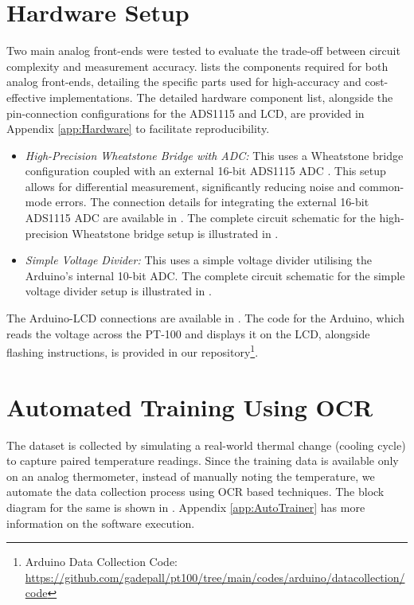 \documentclass[conference]{IEEEtran}
\begin{document}
\section{Hardware Setup}
Two main analog front-ends were tested to evaluate the trade-off between circuit complexity and measurement accuracy.  lists the components required for both analog front-ends, detailing the specific parts used for high-accuracy and cost-effective implementations. The detailed hardware component list, alongside the pin-connection configurations for the ADS1115 and LCD, are provided in Appendix \ref{app:Hardware} to facilitate reproducibility.
%
%
\begin{itemize}
    \item {\em High-Precision Wheatstone Bridge with ADC:} This uses a Wheatstone bridge configuration coupled with an external 16-bit ADS1115 ADC \cite{ads1115_datasheet}. This setup allows for differential measurement, significantly reducing noise and common-mode errors. 
	The connection details for integrating the external 16-bit ADS1115 ADC are  available in . 
	The complete circuit schematic for the high-precision Wheatstone bridge setup is illustrated in .

    \item {\em Simple Voltage Divider:} This uses a simple voltage divider utilising the Arduino's internal 10-bit ADC. 
	The complete circuit schematic for the simple voltage divider setup is illustrated in .

\end{itemize}

The Arduino-LCD connections are available in . 
The code for the Arduino, which reads the voltage across the PT-100 and displays it on the LCD, alongside flashing instructions, is provided in our repository\footnote{Arduino Data Collection Code: \url{https://github.com/gadepall/pt100/tree/main/codes/arduino/datacollection/code}}.

\section{Automated Training Using OCR}
The dataset is collected by simulating a real-world thermal change (cooling cycle) to capture paired temperature readings. Since the training data is available only on an analog thermometer, instead of manually noting the temperature, we automate the data collection process using OCR based techniques. The block diagram for the same is shown in . 
Appendix \ref{app:AutoTrainer} has more information on the software execution.
\end{document}

